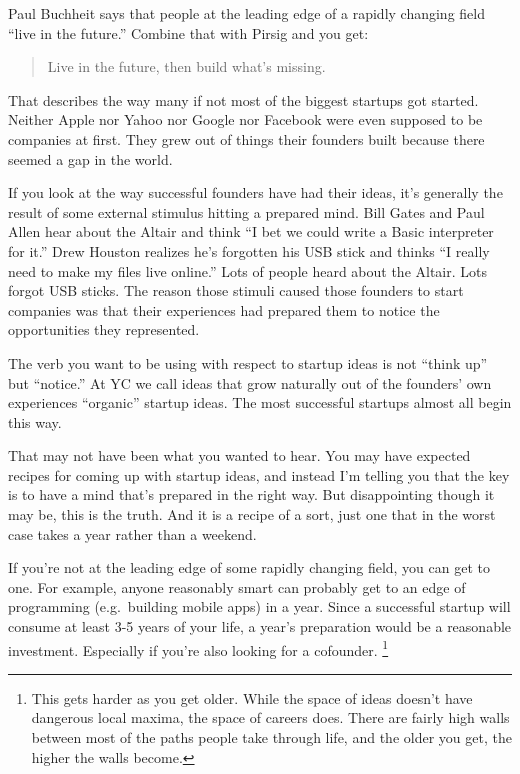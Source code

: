 Paul Buchheit says that people at the leading edge of a rapidly changing
field ``live in the future.'' Combine that with Pirsig and you get:

\begin{quote}
Live in the future, then build what's missing.
\end{quote}

That describes the way many if not most of the biggest startups got
started. Neither Apple nor Yahoo nor Google nor Facebook were even
supposed to be companies at first. They grew out of things their
founders built because there seemed a gap in the world.

If you look at the way successful founders have had their ideas, it's
generally the result of some external stimulus hitting a prepared mind.
Bill Gates and Paul Allen hear about the Altair and think ``I bet we
could write a Basic interpreter for it.'' Drew Houston realizes he's
forgotten his USB stick and thinks ``I really need to make my files live
online.'' Lots of people heard about the Altair. Lots forgot USB sticks.
The reason those stimuli caused those founders to start companies was
that their experiences had prepared them to notice the opportunities
they represented.

The verb you want to be using with respect to startup ideas is not
``think up'' but ``notice.'' At YC we call ideas that grow naturally out
of the founders' own experiences ``organic'' startup ideas. The most
successful startups almost all begin this way.

That may not have been what you wanted to hear. You may have expected
recipes for coming up with startup ideas, and instead I'm telling you
that the key is to have a mind that's prepared in the right way. But
disappointing though it may be, this is the truth. And it is a recipe of
a sort, just one that in the worst case takes a year rather than a
weekend.

If you're not at the leading edge of some rapidly changing field, you
can get to one. For example, anyone reasonably smart can probably get to
an edge of programming (e.g.~building mobile apps) in a year. Since a
successful startup will consume at least 3-5 years of your life, a
year's preparation would be a reasonable investment. Especially if
you're also looking for a cofounder. \footnote{This gets harder as you get older. While the space of ideas
doesn't have dangerous local maxima, the space of careers does. There
are fairly high walls between most of the paths people take through
life, and the older you get, the higher the walls become.}

